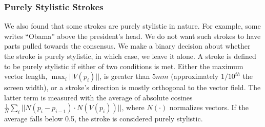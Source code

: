 \subsubsection{Purely Stylistic Strokes}

We also found that some strokes are purely stylistic in nature. For example, some writes ``Obama'' above the president's head. We do not want such strokes to have parts pulled towards the consensus. We make a binary decision about whether the stroke is purely stylistic, in which case, we leave it alone. A stroke is defined to be purely stylistic if either of two conditions is met. Either the maximum vector length, $\max_i||V(p_i)||$, is greater than $5mm$ (approximately $1/10^{th}$ the screen width), or a stroke's direction is mostly orthogonal to the vector field. The latter term is measured with the average of absolute cosines $\frac{1}{N}\sum_i||N(p_i - p_{i-1}) \cdot N(V(p_i))||\textrm{,}$ where $N(\cdot)$ normalizes vectors. If the average falls below 0.5, the stroke is considered purely stylistic.





